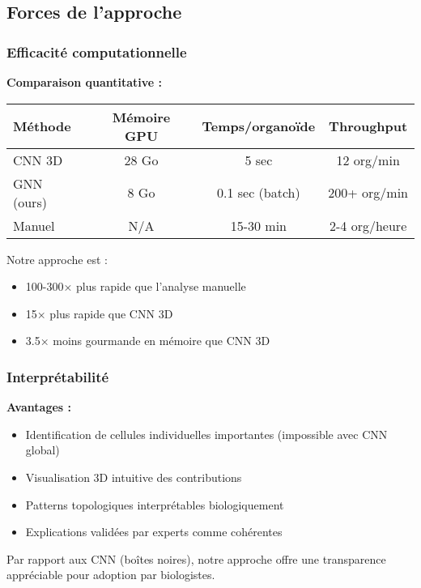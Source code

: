 \subsection{Forces de l'approche}

\subsubsection{Efficacité computationnelle}

\textbf{Comparaison quantitative :}

\begin{center}
\begin{tabular}{|l|c|c|c|}
\hline
\textbf{Méthode} & \textbf{Mémoire GPU} & \textbf{Temps/organoïde} & \textbf{Throughput} \\
\hline
CNN 3D & 28 Go & 5 sec & 12 org/min \\
GNN (ours) & 8 Go & 0.1 sec (batch) & 200+ org/min \\
Manuel & N/A & 15-30 min & 2-4 org/heure \\
\hline
\end{tabular}
\end{center}

Notre approche est :
\begin{itemize}
    \item 100-300× plus rapide que l'analyse manuelle
    \item 15× plus rapide que CNN 3D
    \item 3.5× moins gourmande en mémoire que CNN 3D
\end{itemize}

\subsubsection{Interprétabilité}

\textbf{Avantages :}
\begin{itemize}
    \item Identification de cellules individuelles importantes (impossible avec CNN global)
    \item Visualisation 3D intuitive des contributions
    \item Patterns topologiques interprétables biologiquement
    \item Explications validées par experts comme cohérentes
\end{itemize}

Par rapport aux CNN (boîtes noires), notre approche offre une transparence appréciable pour adoption par biologistes.

